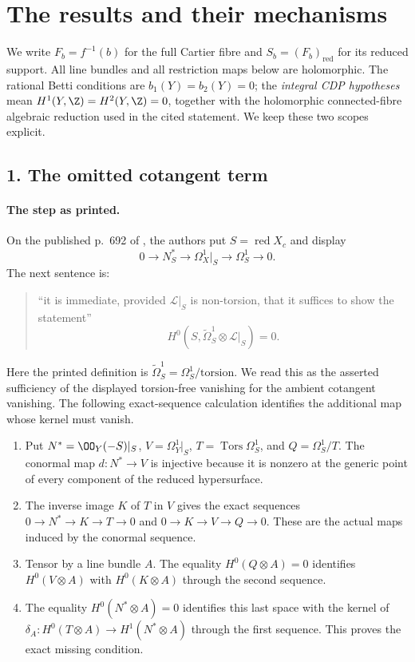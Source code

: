 \section*{The results and their mechanisms}
We write $F_b=f^{-1}(b)$ for the full Cartier fibre and
$S_b=(F_b)_{\mathrm{red}}$ for its reduced support.  All line bundles
and all restriction maps below are holomorphic.  The rational Betti
conditions are $b_1(Y)=b_2(Y)=0$; the \emph{integral CDP hypotheses}
mean $H^1(Y,\Z)=H^2(Y,\Z)=0$, together with the holomorphic
connected-fibre algebraic reduction used in the cited statement.
We keep these two scopes explicit.

\subsection*{1. The omitted cotangent term}
\paragraph{The step as printed.}
On the published p.~692 of \cite{CDP2020}, the authors put
$S=\operatorname{red}X_c$ and display
\[
 0\longrightarrow N_S^*\longrightarrow\Omega_X^1|_S
   \longrightarrow\Omega_S^1\longrightarrow0.
\]
The next sentence is:
\begin{quote}
``it is immediate, provided $\mathcal L|_S$ is non-torsion,
that it suffices to show the statement''
\[
 H^0(S,\widetilde\Omega_S^1\otimes\mathcal L|_S)=0.
 \tag{11}
\]
\end{quote}
Here the printed definition is
$\widetilde\Omega_S^1=\Omega_S^1/\mathrm{torsion}$.
We read this as the asserted sufficiency of the displayed
torsion-free vanishing for the ambient cotangent vanishing.
The following exact-sequence calculation identifies the additional
map whose kernel must vanish.

\RungOne
\begin{enumerate}[label=\arabic*.,leftmargin=*]
\item Put $N^*=\OO_Y(-S)|_S$, $V=\Omega_Y^1|_S$,
$T=\operatorname{Tors}\Omega_S^1$, and $Q=\Omega_S^1/T$.
The conormal map $d:N^*\to V$ is injective because it is
nonzero at the generic point of every component of the reduced
hypersurface.
\item The inverse image $K$ of $T$ in $V$ gives the exact sequences
$0\to N^*\to K\to T\to0$ and $0\to K\to V\to Q\to0$.
These are the actual maps induced by the conormal sequence.
\item Tensor by a line bundle $A$.  The equality
$H^0(Q\otimes A)=0$ identifies $H^0(V\otimes A)$ with
$H^0(K\otimes A)$ through the second sequence.
\item The equality $H^0(N^*\otimes A)=0$ identifies this last
space with the kernel of
$\delta_A:H^0(T\otimes A)\to H^1(N^*\otimes A)$ through the
first sequence.  This proves the exact missing condition.
\end{enumerate}


